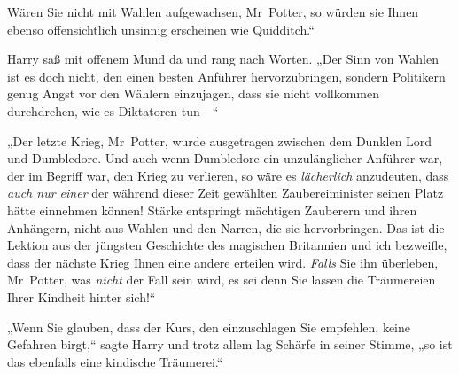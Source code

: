Wären Sie nicht mit Wahlen aufgewachsen, Mr~Potter, so würden sie Ihnen ebenso offensichtlich unsinnig erscheinen wie Quidditch.“

Harry saß mit offenem Mund da und rang nach Worten. „Der Sinn von Wahlen ist es doch nicht, den einen besten Anführer hervorzubringen, sondern Politikern genug Angst vor den Wählern einzujagen, dass sie nicht vollkommen durchdrehen, wie es Diktatoren tun—“

„Der letzte Krieg, Mr~Potter, wurde ausgetragen zwischen dem Dunklen Lord und Dumbledore. Und auch wenn Dumbledore ein unzulänglicher Anführer war, der im Begriff war, den Krieg zu verlieren, so wäre es \emph{lächerlich} anzudeuten, dass \emph{auch nur einer} der während dieser Zeit gewählten Zaubereiminister seinen Platz hätte einnehmen können! Stärke entspringt mächtigen Zauberern und ihren Anhängern, nicht aus Wahlen und den Narren, die sie hervorbringen. Das ist die Lektion aus der jüngsten Geschichte des magischen Britannien und ich bezweifle, dass der nächste Krieg Ihnen eine andere erteilen wird. \emph{Falls} Sie ihn überleben, Mr~Potter, was \emph{nicht} der Fall sein wird, es sei denn Sie lassen die Träumereien Ihrer Kindheit hinter sich!“

„Wenn Sie glauben, dass der Kurs, den einzuschlagen Sie empfehlen, keine Gefahren birgt,“ sagte Harry und trotz allem lag Schärfe in seiner Stimme, „so ist das ebenfalls eine kindische Träumerei.“

